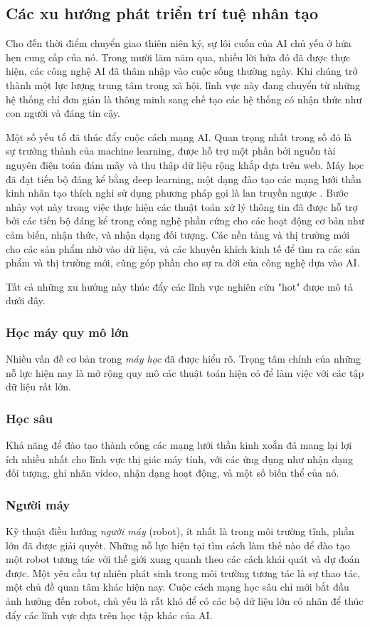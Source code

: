 \subsection{Các xu hướng phát triển trí tuệ nhân tạo}
Cho đến thời điểm chuyển giao thiên niên kỷ, sự lôi cuốn của AI chủ yếu ở hứa hẹn cung cấp của nó. Trong mười lăm năm qua, nhiều lời hứa đó đã được thực hiện, các công nghệ AI đã thâm nhập vào cuộc sống thường ngày. Khi chúng trở thành một lực lượng trung tâm trong xã hội, lĩnh vực này đang chuyển từ những hệ thống chỉ đơn giản là thông minh sang chế tạo các hệ thống có nhận thức như con người và đáng tin cậy.\par
Một số yếu tố đã thúc đẩy cuộc cách mạng AI. Quan trọng nhất trong số đó là sự trưởng thành của machine learning, được hỗ trợ một phần bởi nguồn tài nguyên điện toán đám mây và thu thập dữ liệu rộng khắp dựa trên web. Máy học đã đạt tiến bộ đáng kể bằng deep learning, một dạng đào tạo các mạng lưới thần kinh nhân tạo thích nghi sử dụng phương pháp gọi là lan truyền ngược \parencite{szeto2020deep}. Bước nhảy vọt này trong việc thực hiện các thuật toán xử lý thông tin đã được hỗ trợ bởi các tiến bộ đáng kể trong công nghệ phần cứng cho các hoạt động cơ bản như cảm biến, nhận thức, và nhận dạng đối tượng. Các nền tảng và thị trường mới cho các sản phẩm nhờ vào dữ liệu, và các khuyến khích kinh tế để tìm ra các sản phẩm và thị trường mới, cũng góp phần cho sự ra đời của công nghệ dựa vào AI.\par
Tất cả những xu hướng này thúc đẩy các lĩnh vực nghiên cứu "hot" được mô tả dưới đây.\par
\subsubsection{Học máy quy mô lớn}
Nhiều vấn đề cơ bản trong \textit{máy học} đã được hiểu rõ. Trọng tâm chính của những nỗ lực hiện nay là mở rộng quy mô các thuật toán hiện có để làm việc với các tập dữ liệu rất lớn.
\subsubsection{Học sâu}
Khả năng để đào tạo thành công các mạng lưới thần kinh xoắn đã mang lại lợi ích nhiều nhất cho lĩnh vực thị giác máy tính, với các ứng dụng như nhận dạng đối tượng, ghi nhãn video, nhận dạng hoạt động, và một số biến thể của nó.
\subsubsection{Người máy}
Kỹ thuật điều hướng \textit{người máy} (robot), ít nhất là trong môi trường tĩnh, phần lớn đã được giải quyết. Những nỗ lực hiện tại tìm cách làm thế nào để đào tạo một robot tương tác với thế giới xung quanh theo các cách khái quát và dự đoán được. Một yêu cầu tự nhiên phát sinh trong môi trường tương tác là sự thao tác, một chủ đề quan tâm khác hiện nay. Cuộc cách mạng học sâu chỉ mới bắt đầu ảnh hưởng đến robot, chủ yếu là rất khó để có các bộ dữ liệu lớn có nhãn để thúc đẩy các lĩnh vực dựa trên học tập khác của AI.
